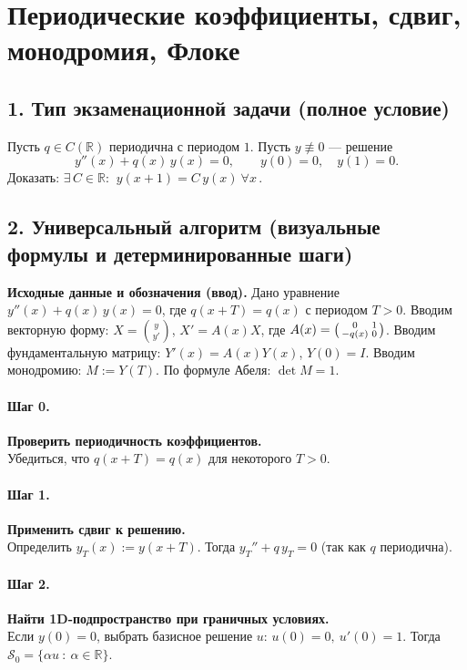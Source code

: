 \section{Периодические коэффициенты, сдвиг, монодромия, Флоке}

\subsection*{1. Тип экзаменационной задачи (полное условие)}
Пусть \(q\in C(\mathbb R)\) периодична с периодом \(1\). Пусть \(y\not\equiv0\) — решение
\[
y''(x)+q(x)\,y(x)=0,\qquad y(0)=0,\quad y(1)=0.
\]
Доказать: \(\exists\,C\in\mathbb R:\ \boxed{\,y(x+1)=C\,y(x)\ \forall x\,}\).

\subsection*{2. Универсальный алгоритм (визуальные формулы и детерминированные шаги)}

\textbf{Исходные данные и обозначения (ввод).} Дано уравнение \(y''(x)+q(x)\,y(x)=0\), где \(q(x+T)=q(x)\) с периодом \(T>0\).
Вводим векторную форму: \(X=\binom{y}{y'}\), \(X'=A(x)X\), где \(A(x)=\begin{psmallmatrix}0&1\\ -q(x)&0\end{psmallmatrix}\).
Вводим фундаментальную матрицу: \(Y'(x)=A(x)Y(x)\), \(Y(0)=I\).
Вводим монодромию: \(M:=Y(T)\).
По формуле Абеля: \(\boxed{\det M=1}\).

\paragraph{Шаг 0.} \textbf{Проверить периодичность коэффициентов.}\\
Убедиться, что \(q(x+T)=q(x)\) для некоторого \(T>0\).

\paragraph{Шаг 1.} \textbf{Применить сдвиг к решению.}\\
Определить \(y_T(x):=y(x+T)\). Тогда \(y_T''+q\,y_T=0\) (так как \(q\) периодична).

\paragraph{Шаг 2.} \textbf{Найти 1D-подпространство при граничных условиях.}\\
Если \(y(0)=0\), выбрать базисное решение \(u\): \(u(0)=0,\ u'(0)=1\).
Тогда \(\mathcal S_0=\{\alpha u\ :\ \alpha\in\mathbb R\}\).

